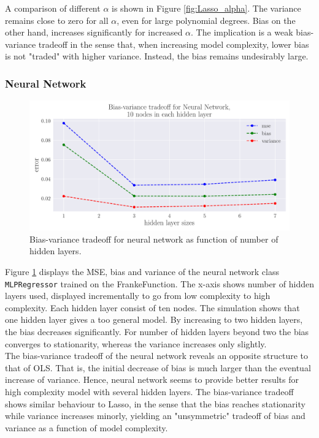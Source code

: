\documentclass[a4paper]{article}
\def\code#1{\texttt{#1}}
\begin{document}
	A comparison of different $\alpha$ is shown in Figure \ref{fig:Lasso_alpha}. The variance remains close to zero for all $\alpha$, even for large polynomial degrees. Bias on the other hand, increases significantly for increased $\alpha$. The implication is a weak bias-variance tradeoff in the sense that, when increasing model complexity, lower bias is not "traded" with higher variance. Instead, the bias remains undesirably large.
	
	\subsubsection*{Neural Network}
	
	\begin{figure}[h]
		\centering
		\includegraphics[scale=0.5]{../output_extra/plots/bias_var_NN_layers4_nodes10.pdf}
		\caption{Bias-variance tradeoff for neural network as function of number of hidden layers.}
		\label{fig:NN}
	\end{figure}
	
	Figure \ref{fig:NN} displays the MSE, bias and variance of the neural network class \code{MLPRegressor} trained on the FrankeFunction. The x-axis shows number of hidden layers used, displayed incrementally to go from low complexity to high complexity. Each hidden layer consist of ten nodes. The simulation shows that one hidden layer gives a too general model. By increasing to two hidden layers, the bias decreases significantly. For number of hidden layers beyond two the bias converges to stationarity, whereas the variance increases only slightly. \\

	The bias-variance tradeoff of the neural network reveals an opposite structure to that of OLS. That is, the initial decrease of bias is much larger than the eventual increase of variance. Hence, neural network seems to provide better results for high complexity model with several hidden layers. The bias-variance tradeoff shows similar behaviour to Lasso, in the sense that the bias reaches stationarity while variance increases minorly, yielding an "unsymmetric" tradeoff of bias and variance as a function of model complexity.
	
\end{document}

